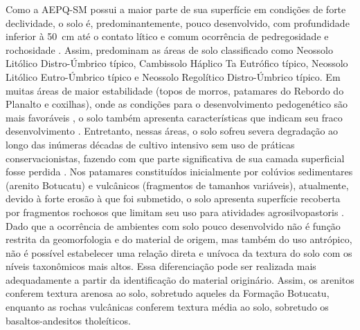 
Como a AEPQ-SM possui a maior parte de sua superfície em condições de forte declividade, o solo é, 
predominantemente, pouco desenvolvido, com profundidade inferior à \SI{50}{\centi\metre} até o 
contato lítico e comum ocorrência de pedregosidade e rochosidade \citep{Miguel2010}. Assim, 
predominam as áreas de solo classificado como Neossolo Litólico Distro-Úmbrico típico, Cambissolo 
Háplico Ta Eutrófico típico, Neossolo Litólico Eutro-Úmbrico típico e Neossolo Regolítico 
Distro-Úmbrico típico. Em muitas áreas de maior estabilidade (topos de morros, patamares do Rebordo 
do Planalto e coxilhas), onde as condições para o desenvolvimento pedogenético são mais favoráveis 
\citep{Moser1990}, o solo também apresenta características que indicam seu fraco desenvolvimento 
\citep{MouraBueno2012}. Entretanto, nessas áreas, o solo sofreu severa degradação ao longo das 
inúmeras décadas de cultivo intensivo sem uso de práticas conservacionistas, fazendo com que parte 
significativa de sua camada superficial fosse perdida \citep{SamuelRosaEtAl2011a}. Nos patamares 
constituídos inicialmente por colúvios sedimentares (arenito Botucatu) e vulcânicos (fragmentos de 
tamanhos variáveis), atualmente, devido à forte erosão à que foi submetido, o solo apresenta 
superfície recoberta por fragmentos rochosos que limitam seu uso para atividades agrosilvopastoris 
\citep{MouraBueno2012}. Dado que a ocorrência de ambientes com solo pouco desenvolvido não é função 
restrita da geomorfologia e do material de origem, mas também do uso antrópico, não é possível 
estabelecer uma relação direta e unívoca da textura do solo com os níveis taxonômicos mais altos. 
Essa diferenciação pode ser realizada mais adequadamente a partir da identificação do material 
originário. Assim, os arenitos conferem textura arenosa ao solo, sobretudo aqueles da Formação 
Botucatu, enquanto as rochas vulcânicas conferem textura média ao solo, sobretudo os 
basaltos-andesitos tholeíticos.

